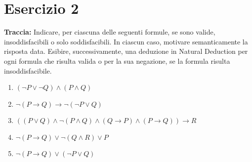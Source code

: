 \section*{Esercizio 2}

\textbf{Traccia:} Indicare, per ciascuna delle seguenti formule, se sono valide, insoddisfacibili o solo soddisfacibili. In ciascun caso, motivare semanticamente la risposta data. Esibire, successivamente, una deduzione in Natural Deduction per ogni formula che risulta valida o per la sua negazione, se la formula risulta insoddisfacibile.
\begin{enumerate}
    \item[(a)] $(\neg P\vee\neg Q)\wedge(P\wedge Q)$
    \item[(b)] $\neg(P\rightarrow Q)\rightarrow\neg(\neg P\vee Q)$
    \item[(c)] $((P\vee Q)\wedge\neg(P\wedge Q)\wedge(Q\rightarrow P)\wedge(P\rightarrow Q))\rightarrow R$
    \item[(d)] $\neg(P\rightarrow Q)\vee\neg(Q\wedge R)\vee P$
    \item[(e)] $\neg(P\rightarrow Q)\vee(\neg P\vee Q)$
\end{enumerate}

